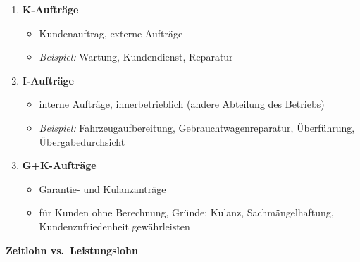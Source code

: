 \begin{enumerate}
\item
  \textbf{K-Aufträge}

  \begin{itemize}
  \item
    Kundenauftrag, externe Aufträge
  \item
    \emph{Beispiel:} Wartung, Kundendienst, Reparatur
  \end{itemize}
\item
  \textbf{I-Aufträge}

  \begin{itemize}
  \item
    interne Aufträge, innerbetrieblich (andere Abteilung des Betriebs)
  \item
    \emph{Beispiel:} Fahrzeugaufbereitung, Gebrauchtwagenreparatur,
    Überführung, Übergabedurchsicht
  \end{itemize}
\item
  \textbf{G+K-Aufträge}

  \begin{itemize}
  \item
    Garantie- und Kulanzanträge
  \item
    für Kunden ohne Berechnung, Gründe: Kulanz, Sachmängelhaftung,
    Kundenzufriedenheit gewährleisten
  \end{itemize}
\end{enumerate}

\newpage

\textbf{Zeitlohn vs.~Leistungslohn}

